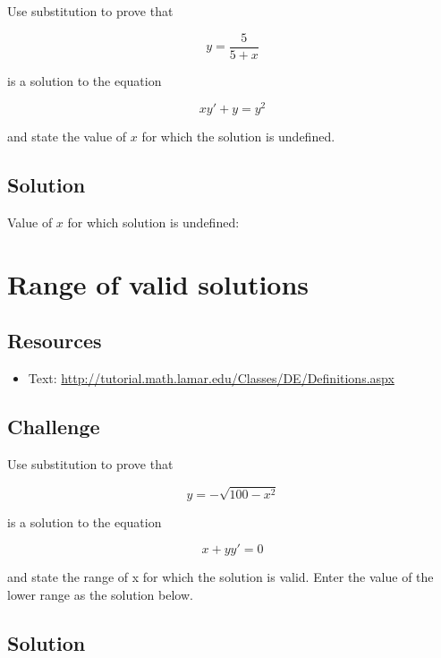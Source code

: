 Use substitution to prove that

\begin{equation}
    y=\frac{5}{5+x}
\end{equation}

is a solution to the equation

\begin{equation}
    x y'+y=y^2
\end{equation}

and state the value of $x$ for which the solution is undefined.

\subsection*{Solution}
Value of $x$ for which solution is undefined:





\newpage

\section{Range of valid solutions}

\subsection*{Resources}
\begin{itemize}
    \item Text: \url{http://tutorial.math.lamar.edu/Classes/DE/Definitions.aspx}
\end{itemize}

\subsection*{Challenge}

Use substitution to prove that

\begin{equation}
    y = -\sqrt{100-x^2}
\end{equation}

is a solution to the equation

\begin{equation}
    x + y y' = 0
\end{equation}

and state the range of x for which the solution is valid. Enter the value of the lower range as the solution below.

\subsection*{Solution}
